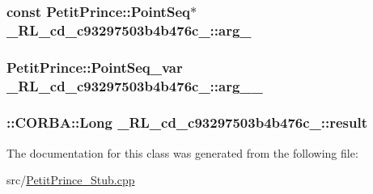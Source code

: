 \subsubsection[{\texorpdfstring{arg\+\_\+1}{arg_1}}]{\setlength{\rightskip}{0pt plus 5cm}const Petit\+Prince\+::\+Point\+Seq$\ast$ \+\_\+R\+L\+\_\+cd\+\_\+c93297503b4b476c\+\_\+::arg\+\_}\hypertarget{class__0_r_l__cd__c93297503b4b476c__51000000_a7a12cf2b92afccb92f38ae00be0d91d8}{}\label{class__0_r_l__cd__c93297503b4b476c__51000000_a7a12cf2b92afccb92f38ae00be0d91d8}
\subsubsection[{\texorpdfstring{arg\+\_\+1\+\_\+}{arg_1_}}]{\setlength{\rightskip}{0pt plus 5cm}Petit\+Prince\+::\+Point\+Seq\+\_\+var \+\_\+R\+L\+\_\+cd\+\_\+c93297503b4b476c\+\_\+::arg\+\_\+\_\+}\hypertarget{class__0_r_l__cd__c93297503b4b476c__51000000_a20400a7189ab950f2440a9eff1293092}{}\label{class__0_r_l__cd__c93297503b4b476c__51000000_a20400a7189ab950f2440a9eff1293092}
\subsubsection[{\texorpdfstring{result}{result}}]{\setlength{\rightskip}{0pt plus 5cm}\+::C\+O\+R\+B\+A\+::\+Long \+\_\+R\+L\+\_\+cd\+\_\+c93297503b4b476c\+\_\+::result}\hypertarget{class__0_r_l__cd__c93297503b4b476c__51000000_a670d0d3e4c907d3c2a1e627ed061c956}{}\label{class__0_r_l__cd__c93297503b4b476c__51000000_a670d0d3e4c907d3c2a1e627ed061c956}


The documentation for this class was generated from the following file\+:\begin{DoxyCompactItemize}
\item 
src/\hyperlink{_petit_prince___stub_8cpp}{Petit\+Prince\+\_\+\+Stub.\+cpp}\end{DoxyCompactItemize}

